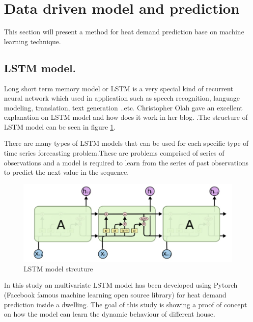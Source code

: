 \section{Data driven model and prediction}

This section will present a method for heat demand prediction base on machine learning technique.


\subsection{LSTM model.}

Long short term memory model or LSTM is a very special kind of recurrent neural network which used in application such as speech recognition, language modeling, translation, text generation ..etc. Christopher Olah gave an excellent explanation on LSTM model and how does it work in her blog. \cite{LSTM}.The structure of LSTM model can be seen in figure \ref{fig:LSTM}.

There are many types of LSTM models that can be used for each specific type of time series forecasting problem.These are problems comprised of series of observations and a model is required to learn from the series of past observations to predict the next value in the sequence.

\begin{figure}[H]
	\centering
	\includegraphics[width=1.0\columnwidth]{Pictures/LSTM strcuture.jpg}
	\caption[Short title]{LSTM model strcuture}
	\label{fig:LSTM}
	\end{figure}


In this study an multivariate LSTM model has been developed using Pytorch (Facebook famous machine learning open source library) for heat demand prediction inside a dwelling. The goal of this study is showing a proof of concept on how the model can learn the dynamic behaviour of different house.

